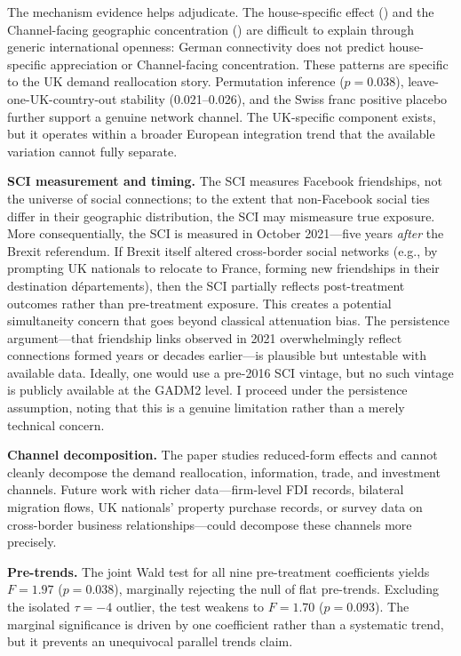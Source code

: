 \documentclass[12pt]{article}
\begin{document}
The mechanism evidence helps adjudicate. The house-specific effect () and the Channel-facing geographic concentration () are difficult to explain through generic international openness: German connectivity does not predict house-specific appreciation or Channel-facing concentration. These patterns are specific to the UK demand reallocation story. Permutation inference ($p = 0.038$), leave-one-UK-country-out stability (0.021--0.026), and the Swiss franc positive placebo further support a genuine network channel. The UK-specific component exists, but it operates within a broader European integration trend that the available variation cannot fully separate.

\textbf{SCI measurement and timing.} The SCI measures Facebook friendships, not the universe of social connections; to the extent that non-Facebook social ties differ in their geographic distribution, the SCI may mismeasure true exposure. More consequentially, the SCI is measured in October 2021---five years \textit{after} the Brexit referendum. If Brexit itself altered cross-border social networks (e.g., by prompting UK nationals to relocate to France, forming new friendships in their destination d\'epartements), then the SCI partially reflects post-treatment outcomes rather than pre-treatment exposure. This creates a potential simultaneity concern that goes beyond classical attenuation bias. The persistence argument---that friendship links observed in 2021 overwhelmingly reflect connections formed years or decades earlier---is plausible but untestable with available data. Ideally, one would use a pre-2016 SCI vintage, but no such vintage is publicly available at the GADM2 level. I proceed under the persistence assumption, noting that this is a genuine limitation rather than a merely technical concern.

\textbf{Channel decomposition.} The paper studies reduced-form effects and cannot cleanly decompose the demand reallocation, information, trade, and investment channels. Future work with richer data---firm-level FDI records, bilateral migration flows, UK nationals' property purchase records, or survey data on cross-border business relationships---could decompose these channels more precisely.

\textbf{Pre-trends.} The joint Wald test for all nine pre-treatment coefficients yields $F = 1.97$ ($p = 0.038$), marginally rejecting the null of flat pre-trends. Excluding the isolated $\tau = -4$ outlier, the test weakens to $F = 1.70$ ($p = 0.093$). The marginal significance is driven by one coefficient rather than a systematic trend, but it prevents an unequivocal parallel trends claim.
\end{document}
